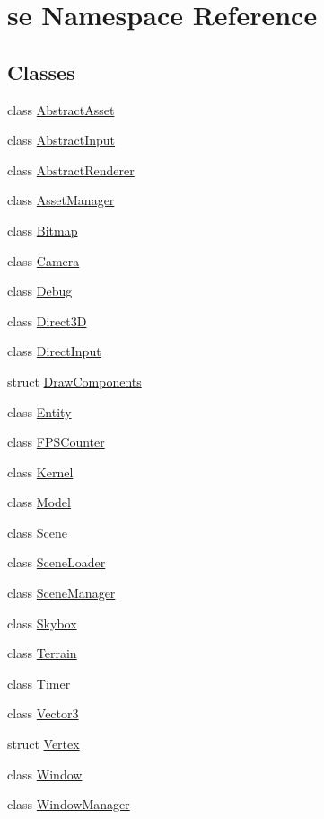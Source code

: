 \hypertarget{namespacese}{}\section{se Namespace Reference}
\label{namespacese}
\subsection*{Classes}
\begin{DoxyCompactItemize}
\item 
class \mbox{\hyperlink{classse_1_1_abstract_asset}{Abstract\+Asset}}
\item 
class \mbox{\hyperlink{classse_1_1_abstract_input}{Abstract\+Input}}
\item 
class \mbox{\hyperlink{classse_1_1_abstract_renderer}{Abstract\+Renderer}}
\item 
class \mbox{\hyperlink{classse_1_1_asset_manager}{Asset\+Manager}}
\item 
class \mbox{\hyperlink{classse_1_1_bitmap}{Bitmap}}
\item 
class \mbox{\hyperlink{classse_1_1_camera}{Camera}}
\item 
class \mbox{\hyperlink{classse_1_1_debug}{Debug}}
\item 
class \mbox{\hyperlink{classse_1_1_direct3_d}{Direct3D}}
\item 
class \mbox{\hyperlink{classse_1_1_direct_input}{Direct\+Input}}
\item 
struct \mbox{\hyperlink{structse_1_1_draw_components}{Draw\+Components}}
\item 
class \mbox{\hyperlink{classse_1_1_entity}{Entity}}
\item 
class \mbox{\hyperlink{classse_1_1_f_p_s_counter}{F\+P\+S\+Counter}}
\item 
class \mbox{\hyperlink{classse_1_1_kernel}{Kernel}}
\item 
class \mbox{\hyperlink{classse_1_1_model}{Model}}
\item 
class \mbox{\hyperlink{classse_1_1_scene}{Scene}}
\item 
class \mbox{\hyperlink{classse_1_1_scene_loader}{Scene\+Loader}}
\item 
class \mbox{\hyperlink{classse_1_1_scene_manager}{Scene\+Manager}}
\item 
class \mbox{\hyperlink{classse_1_1_skybox}{Skybox}}
\item 
class \mbox{\hyperlink{classse_1_1_terrain}{Terrain}}
\item 
class \mbox{\hyperlink{classse_1_1_timer}{Timer}}
\item 
class \mbox{\hyperlink{classse_1_1_vector3}{Vector3}}
\item 
struct \mbox{\hyperlink{structse_1_1_vertex}{Vertex}}
\item 
class \mbox{\hyperlink{classse_1_1_window}{Window}}
\item 
class \mbox{\hyperlink{classse_1_1_window_manager}{Window\+Manager}}
\end{DoxyCompactItemize}
